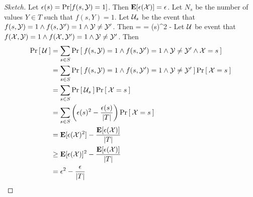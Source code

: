 \begin{proof}[Sketch]
Let $\epsilon(s) = \Pr[f(s,{\cal Y}) = 1]$. 
Then ${\textbf E}[\epsilon({\cal X})] = \epsilon$. Let $N_s$ be the number of values
$Y \in T$ such that $f(s,Y) = 1$. Let ${\cal U}_s$ be the event that $f(s,{\cal Y}) =
1 \land f(s,{\cal Y}') = 1 \land {\cal Y} \ne {\cal Y}'$. Then
\bnm
   =  = \epsilon(s)^2 -  
\enm
Let ${\cal U}$ be event that $f({\cal X},{\cal Y}) = 1 \land f({\cal X},{\cal Y}') = 1 \land
{\cal Y} \ne {\cal Y}'$. Then 
\begin{align*}
  \Pr\left[\: {\cal U} \:\right] 
  & = \sum_{s \in S} \Pr\left[\: f(s,{\cal Y}) = 1 \land f(s,{\cal Y}') = 1 \land {\cal Y} \ne {\cal Y}' \land {\cal X} = s \:\right]\\
  & = \sum_{s \in S} \Pr\left[\: f(s,{\cal Y}) = 1 \land f(s,{\cal Y}') = 1 \land {\cal Y} \ne {\cal Y}' \:\right]\Pr\left[\: {\cal X} = s \:\right]\\
  & = \sum_{s \in S} \Pr\left[\: {\cal U}_s \:\right] \Pr\left[\: {\cal X} = s \:\right]\\
  & = \sum_{s \in S} \left(\epsilon(s)^2 - \frac{\epsilon(s)}{|T|}\right) \Pr\left[\: {\cal X} = s \:\right]\\
  & = {\textbf E}[\epsilon({\cal X})^2] - \frac{{\textbf E}[\epsilon({\cal X})]}{|T|}\\
  & \ge {\textbf E}[\epsilon({\cal X})]^2 - \frac{{\textbf E}[\epsilon({\cal X})]}{|T|}\\
  & = \epsilon^2 - \frac{\epsilon}{|T|}
\end{align*}
\end{proof}

